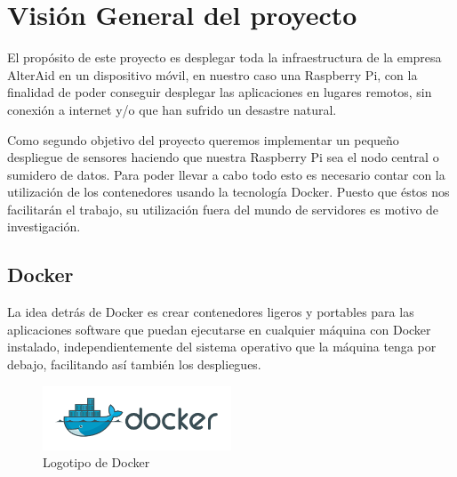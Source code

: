 \chapter{Visión General del proyecto}

El propósito de este proyecto es desplegar toda la infraestructura de la empresa AlterAid en un dispositivo móvil, en nuestro caso una Raspberry Pi, con la finalidad de poder conseguir desplegar las aplicaciones en lugares remotos, sin conexión a internet y/o que han sufrido un desastre natural.

Como segundo objetivo del proyecto queremos implementar un pequeño despliegue de sensores haciendo que nuestra Raspberry Pi sea el nodo central o sumidero de datos. Para poder llevar a cabo todo esto es necesario contar con la utilización de los contenedores usando la tecnología Docker. Puesto que éstos nos facilitarán el trabajo, su utilización fuera del mundo de servidores es motivo de investigación.

\section{Docker}

La idea detrás de Docker es crear contenedores ligeros y portables para las aplicaciones software que puedan ejecutarse en cualquier máquina con Docker instalado, independientemente del sistema operativo que la máquina tenga por debajo, facilitando así también los despliegues.

\begin{figure}[htb]
\begin{center}
\includegraphics[width=0.5\textwidth]{./setup/dockerLogo}
\caption{Logotipo de Docker}
\label{F:prova}
\end{center}
\end{figure}


